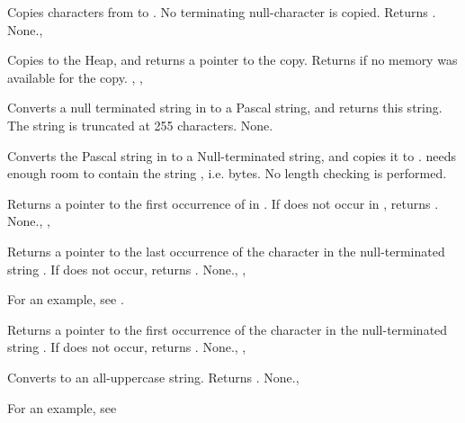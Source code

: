 {
Copies  characters from  to . No
terminating null-character is copied.
Returns .
}
{None.}{, }

\html{}

{
Copies  to the Heap, and returns a pointer to the copy.
}
{Returns  if no memory was available for the copy.}
{, , }

\html{}

{
Converts a null terminated string in  to a Pascal string, and returns
this string. The string is truncated at 255 characters.
}
{None.}{ }

\html{}

{
Converts the Pascal string in  to a Null-terminated 
string, and copies it to .  needs enough room to contain
the string , i.e.  bytes.
}
{No length checking is performed.}{ }

\html{}

{
Returns a pointer to the first occurrence of  in .
If  does not occur in , returns .
}
{None.}{, , }

\html{}

{
Returns a pointer to the last occurrence of the character  in the
null-terminated string . If  does not occur, returns
.
}
{None.}{, , }

For an example, see .

{
Returns a pointer to the first occurrence of the character  in the
null-terminated string . If  does not occur, returns
.
}
{None.}{, , }

\html{}

{
Converts  to an all-uppercase string. Returns .
}
{None.}{, }

For an example, see 

